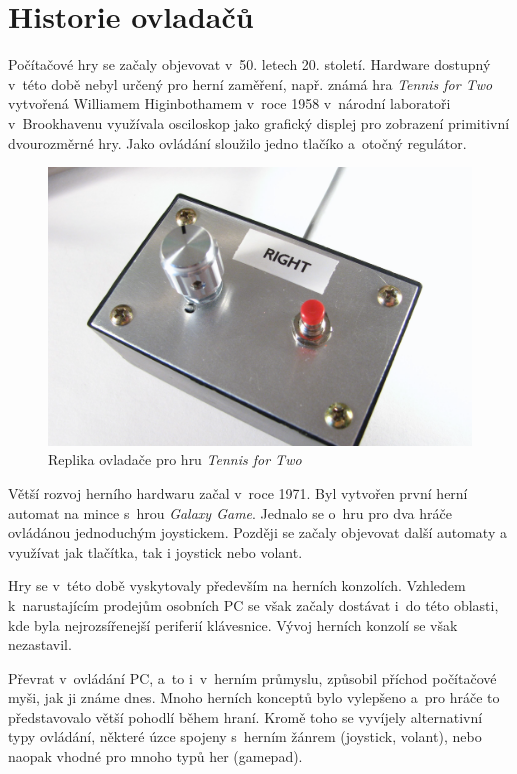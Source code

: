 \documentclass[thesis=B,czech,hidelinks]{FITthesis}[2012/06/26] %
\begin{document}
\section{Historie ovladačů}

Počítačové hry se začaly objevovat v~50. letech 20. století. Hardware dostupný v~této době nebyl určený pro herní zaměření, např. známá hra \textit{Tennis for Two} vytvořená Williamem Higinbothamem v~roce 1958 v~národní laboratoři v~Brookhavenu využívala osciloskop jako grafický displej pro zobrazení primitivní dvourozměrné hry. Jako ovládání sloužilo jedno tlačíko a~otočný regulátor.\cite{gamevshardware}

\begin{figure}
\center
\includegraphics[width=\textwidth/2]{first_controller}
\caption{Replika ovladače pro hru \textit{Tennis for Two}\cite{gamevshardware}}
\end{figure}


Větší rozvoj herního hardwaru začal v~roce 1971. Byl vytvořen první herní automat na mince s~hrou \textit{Galaxy Game}. Jednalo se o~hru pro dva hráče ovládánou jednoduchým joystickem. Později se začaly objevovat další automaty a využívat jak tlačítka, tak i joystick nebo volant.

Hry se v~této době vyskytovaly především na herních konzolích. Vzhledem k~narustajícím prodejům osobních PC se však začaly dostávat i~do této oblasti, kde byla nejrozsířenejší periferií klávesnice. Vývoj herních konzolí se však nezastavil.

Převrat v~ovládání PC, a~to i~v~herním průmyslu, způsobil příchod počítačové myši, jak ji známe dnes. Mnoho herních konceptů bylo vylepšeno a~pro hráče to představovalo větší pohodlí během hraní. Kromě toho se vyvíjely alternativní typy ovládání, některé úzce spojeny s~herním žánrem (joystick, volant), nebo naopak vhodné pro mnoho typů her (gamepad). \cite{gamevshardware}
\end{document}
